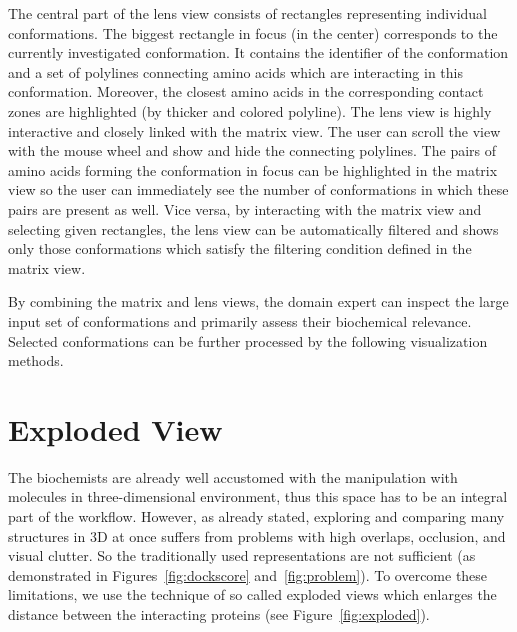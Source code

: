 \documentclass[journal]{vgtc}                %
\begin{document}
The central part of the lens view consists of rectangles representing individual conformations. 
The biggest rectangle in focus (in the center) corresponds to the currently investigated conformation. 
It contains the identifier of the conformation and a set of polylines connecting amino acids which are interacting in this conformation.
Moreover, the closest amino acids in the corresponding contact zones are highlighted (by thicker and colored polyline).
The lens view is highly interactive and closely linked with the matrix view.
The user can scroll the view with the mouse wheel and show and hide the connecting polylines.
The pairs of amino acids forming the conformation in focus can be highlighted in the matrix view so the user can immediately see the number of conformations in which these pairs are present as well.
Vice versa, by interacting with the matrix view and selecting given rectangles, the lens view can be automatically filtered and shows only those conformations which satisfy the filtering condition defined in the matrix view.

By combining the matrix and lens views, the domain expert can inspect the large input set of conformations and primarily assess their biochemical relevance.
Selected conformations can be further processed by the following visualization methods.

\section{Exploded View}
The biochemists are already well accustomed with the manipulation with molecules in three-dimensional environment, thus this space has to be an integral part of the workflow.
However, as already stated, exploring and comparing many structures in 3D at once suffers from problems with high overlaps, occlusion, and visual clutter. 
So the traditionally used representations are not sufficient (as demonstrated in Figures~\ref{fig:dockscore} and~\ref{fig:problem}).
To overcome these limitations, we use the technique of so called exploded views which enlarges the distance between the interacting proteins (see Figure~\ref{fig:exploded}). 
\end{document}

